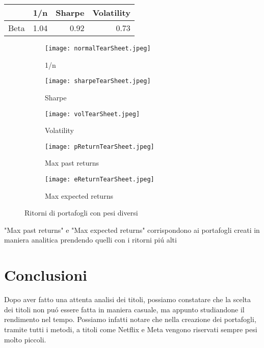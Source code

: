 \documentclass{report}
\begin{document}
\begin{tabular}{lrrr}
\toprule
{} &     1/n &     Sharpe &      Volatility \\
\midrule
Beta &  1.04 &  0.92 &  0.73 \\

\bottomrule
\end{tabular}

\newpage
\begin{figure}[h]

\begin{subfigure}{0.5\textwidth}
\texttt{[image: normalTearSheet.jpeg]} 
\caption{1/n}
\label{fig:subim1}
\end{subfigure}
\begin{subfigure}{0.5\textwidth}
\texttt{[image: sharpeTearSheet.jpeg]}
\caption{Sharpe}
\label{fig:subim2}
\end{subfigure}
\begin{subfigure}{0.5\textwidth}
\texttt{[image: volTearSheet.jpeg]}
\caption{Volatility}
\label{fig:subim3}
\end{subfigure}
\begin{subfigure}{0.5\textwidth}
\texttt{[image: pReturnTearSheet.jpeg]}
\caption{Max past returns}
\label{fig:subim4}
\end{subfigure}
\begin{subfigure}{0.5\textwidth}
\texttt{[image: eReturnTearSheet.jpeg]}
\caption{Max expected returns}
\label{fig:subim5}
\end{subfigure}

\caption{Ritorni di portafogli con pesi diversi}
\label{fig:image2}
\end{figure}

"Max past returns" e "Max expected returns" corrispondono ai portafogli creati in maniera analitica prendendo quelli con i ritorni piú alti

\chapter{Conclusioni}
Dopo aver fatto una attenta analisi dei titoli, possiamo constatare che la scelta dei titoli non puó essere fatta in maniera casuale, ma appunto studiandone il rendimento nel tempo. Possiamo infatti notare che nella creazione dei portafogli, tramite tutti i metodi, a titoli come Netflix e Meta  vengono riservati sempre pesi molto piccoli.
\tableofcontents
\end{document}
